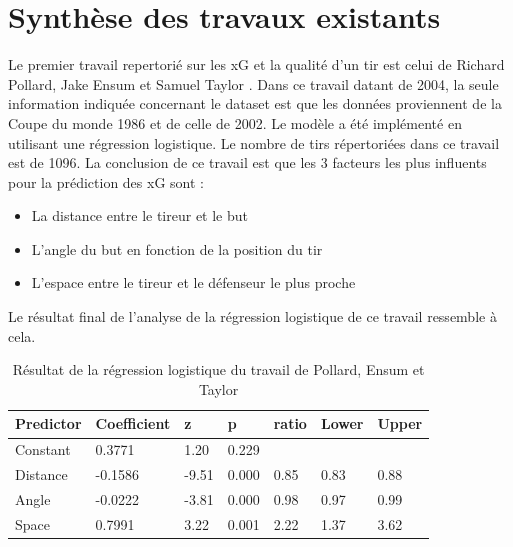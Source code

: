 \documentclass[12pt]{article}
\begin{document}
\newpage
\section{Synthèse des travaux existants}
\label{sec:synthese}
Le premier travail repertorié sur les xG et la qualité d'un tir est celui de Richard Pollard, Jake Ensum et Samuel Taylor \cite{pollardEstimatingProbabilityShot2004}.
Dans ce travail datant de 2004, la seule information indiquée concernant le dataset est que les données proviennent de la Coupe du monde 1986 et de celle de 2002.
Le modèle a été implémenté en utilisant une régression logistique.
Le nombre de tirs répertoriées dans ce travail est de 1096.
La conclusion de ce travail est que les 3 facteurs les plus influents pour la prédiction des xG sont :
\begin{itemize}
    \item La distance entre le tireur et le but
    \item L'angle du but en fonction de la position du tir
    \item L'espace entre le tireur et le défenseur le plus proche
\end{itemize}
Le résultat final de l'analyse de la régression logistique de ce travail ressemble à cela.
\begin{table}[htp]
    \centering
    \begin{tabular}{|l|l|l|l|l|l|l|}
        \hline
        \textbf{Predictor} & \textbf{Coefficient} & \textbf{z} & \textbf{p} & \textbf{ratio} & \textbf{Lower} & \textbf{Upper} \\ \hline
        Constant           & 0.3771               & 1.20       & 0.229      &                &                &                \\ \hline
        Distance           & -0.1586              & -9.51      & 0.000      & 0.85           & 0.83           & 0.88           \\ \hline
        Angle              & -0.0222              & -3.81      & 0.000      & 0.98           & 0.97           & 0.99           \\ \hline
        Space              & 0.7991               & 3.22       & 0.001      & 2.22           & 1.37           & 3.62           \\ \hline
    \end{tabular}
    \caption{Résultat de la régression logistique du travail de Pollard, Ensum et Taylor}
\end{table}
\end{document}
